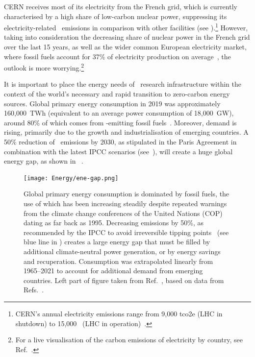 \documentclass[../SustainableHEP.tex]{subfiles}
\begin{document}
CERN receives most of its electricity from the French grid, which is currently characterised by a high share of low-carbon nuclear power, suppressing its electricity-related \CdO\ emissions in comparison with other facilities  (see ).\footnote{CERN's annual electricity emissions range from 9,000 \acrshort{tco2e} (LHC in shutdown) to 15,000 \tCdOe\ (LHC in operation)~\cite{Environment:2737239}.} However, taking into consideration the decreasing share of nuclear power in the French grid over the last 15 years, as well as the wider common European electricity market, where fossil fuels account for 37\% of electricity production on average~\cite{BPReport}, the outlook is more worrying.\footnote{For a live visualisation of the carbon emissions of electricity by country, see Ref.~\cite{ElectricityMap}.}

It is important to place the energy needs of \ACR\ research infrastructure within the context of the world's necessary and rapid transition to zero-carbon energy sources. Global primary energy consumption in 2019 was approximately 160,000~TWh (equivalent to an average power consumption of 18,000~GW), around 80\% of which comes from \CdO-emitting fossil fuels~\cite{OWDfuels}. Moreover, demand is rising, primarily due to the growth and industrialisation of emerging countries.  A 50\% reduction of \CdO\ emissions by 2030, as stipulated in the Paris Agreement in combination with the latest IPCC scenarios (see~), will create a huge global energy gap, as shown in ~\cite{physikkonkret}. 


\begin{figure}[!ht]
     \centering
    \texttt{[image: Energy/ene-gap.png]}     
    \caption[Primary energy consumption is dominated by fossil fuels]%
        {Global primary energy consumption is dominated by fossil fuels, the use of which has been increasing steadily despite repeated warnings from the climate change conferences of the United Nations (COP) dating as far back as 1995. Decreasing emissions by 50\%, as recommended by the IPCC to avoid irreversible tipping points~\cite{OECDTippingPoints} (see blue line in ) creates a large energy gap that must be filled by additional climate-neutral power generation, or by energy savings and recuperation. Consumption was extrapolated linearly from 1965--2021 to account for additional demand from emerging countries. Left part of figure taken from Ref.~\cite{OWDgap}, based on data from Refs.~\cite{Smil,BP2022}.\label{fig:ene-gap}}
 \end{figure}
\end{document}
